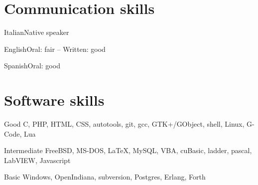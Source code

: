 \documentclass[fontsize=10pt]{tccv}
\begin{document}
\section{Communication skills}

\begin{factlist}
\item{Italian}{Native speaker}
\item{English}{Oral: fair -- Written: good}
\item{Spanish}{Oral: good}
\end{factlist}

\section{Software skills}

\begin{factlist}

\item{Good}
     {C, PHP, HTML, CSS, autotools, git, gcc, GTK+/GObject, shell,
      Linux, G-Code, Lua}

\item{Intermediate}
     {FreeBSD, MS-DOS, \LaTeX, MySQL, VBA, cuBasic, ladder, pascal,
      LabVIEW, Javascript}

\item{Basic}
     {Windows, OpenIndiana, subversion, Postgres, Erlang, Forth}

\end{factlist}
\end{document}
